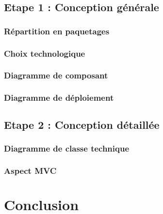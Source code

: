 \documentclass[a4paper,table]{article}
\begin{document}
\subsection{Etape 1 : Conception générale}

\subsubsection{Répartition en paquetages}

\subsubsection{Choix technologique}

\subsubsection{Diagramme de composant}

\subsubsection{Diagramme de déploiement}

\subsection{Etape 2 : Conception détaillée}

\subsubsection{Diagramme de classe technique}

\subsubsection{Aspect MVC}

\newpage

\section*{Conclusion}
\end{document}
